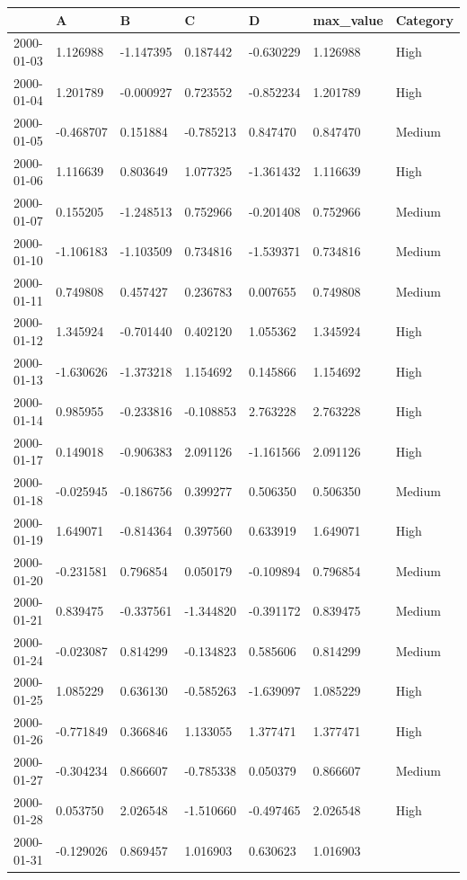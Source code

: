 \documentclass[
  letterpaper,
  DIV=11,
  numbers=noendperiod]{scrreport}
\begin{document}
\begin{longtable}[]{@{}lllllll@{}}
\toprule()
& A & B & C & D & max\_value & Category \\
\midrule()
\endhead
2000-01-03 & 1.126988 & -1.147395 & 0.187442 & -0.630229 & 1.126988 &
High \\
2000-01-04 & 1.201789 & -0.000927 & 0.723552 & -0.852234 & 1.201789 &
High \\
2000-01-05 & -0.468707 & 0.151884 & -0.785213 & 0.847470 & 0.847470 &
Medium \\
2000-01-06 & 1.116639 & 0.803649 & 1.077325 & -1.361432 & 1.116639 &
High \\
2000-01-07 & 0.155205 & -1.248513 & 0.752966 & -0.201408 & 0.752966 &
Medium \\
2000-01-10 & -1.106183 & -1.103509 & 0.734816 & -1.539371 & 0.734816 &
Medium \\
2000-01-11 & 0.749808 & 0.457427 & 0.236783 & 0.007655 & 0.749808 &
Medium \\
2000-01-12 & 1.345924 & -0.701440 & 0.402120 & 1.055362 & 1.345924 &
High \\
2000-01-13 & -1.630626 & -1.373218 & 1.154692 & 0.145866 & 1.154692 &
High \\
2000-01-14 & 0.985955 & -0.233816 & -0.108853 & 2.763228 & 2.763228 &
High \\
2000-01-17 & 0.149018 & -0.906383 & 2.091126 & -1.161566 & 2.091126 &
High \\
2000-01-18 & -0.025945 & -0.186756 & 0.399277 & 0.506350 & 0.506350 &
Medium \\
2000-01-19 & 1.649071 & -0.814364 & 0.397560 & 0.633919 & 1.649071 &
High \\
2000-01-20 & -0.231581 & 0.796854 & 0.050179 & -0.109894 & 0.796854 &
Medium \\
2000-01-21 & 0.839475 & -0.337561 & -1.344820 & -0.391172 & 0.839475 &
Medium \\
2000-01-24 & -0.023087 & 0.814299 & -0.134823 & 0.585606 & 0.814299 &
Medium \\
2000-01-25 & 1.085229 & 0.636130 & -0.585263 & -1.639097 & 1.085229 &
High \\
2000-01-26 & -0.771849 & 0.366846 & 1.133055 & 1.377471 & 1.377471 &
High \\
2000-01-27 & -0.304234 & 0.866607 & -0.785338 & 0.050379 & 0.866607 &
Medium \\
2000-01-28 & 0.053750 & 2.026548 & -1.510660 & -0.497465 & 2.026548 &
High \\
2000-01-31 & -0.129026 & 0.869457 & 1.016903 & 0.630623 & 1.016903 &

\end{longtable}
\end{document}
